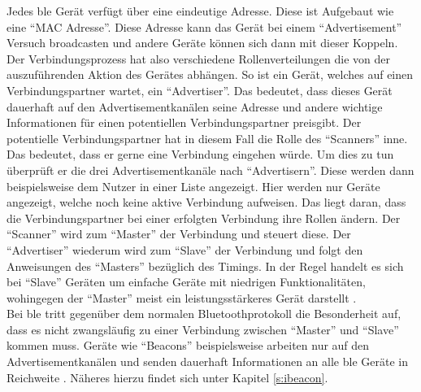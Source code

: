 \noindent Jedes \ac{ble} Gerät verfügt über eine eindeutige Adresse. Diese ist Aufgebaut wie eine "`MAC Adresse"'. Diese Adresse kann das Gerät bei einem "`Advertisement"' Versuch broadcasten und andere Geräte können sich dann mit dieser Koppeln. Der Verbindungsprozess hat also verschiedene Rollenverteilungen die von der auszuführenden Aktion des Gerätes abhängen. So ist ein Gerät, welches auf einen Verbindungspartner wartet, ein "`Advertiser"'. Das bedeutet, dass dieses Gerät dauerhaft auf den Advertisementkanälen seine Adresse und andere wichtige Informationen für einen potentiellen Verbindungspartner preisgibt. Der potentielle Verbindungspartner hat in diesem Fall die Rolle des "`Scanners"' inne. Das bedeutet, dass er gerne eine Verbindung eingehen würde. Um dies zu tun überprüft er die drei Advertisementkanäle nach "`Advertisern"'. Diese werden dann beispielsweise dem Nutzer in einer Liste angezeigt. Hier werden nur Geräte angezeigt, welche noch keine aktive Verbindung aufweisen. Das liegt daran, dass die Verbindungspartner bei einer erfolgten Verbindung ihre Rollen ändern. Der "`Scanner"' wird zum "`Master"' der Verbindung und steuert diese. Der "`Advertiser"' wiederum wird zum "`Slave"' der Verbindung und folgt den Anweisungen des "`Masters"' bezüglich des Timings. In der Regel handelt es sich bei "`Slave"' Geräten um einfache Geräte mit niedrigen Funktionalitäten, wohingegen der "`Master"' meist ein leistungsstärkeres Gerät darstellt \cite[Seite 18f]{Townsend14:GSB}.\\  

\noindent Bei \ac{ble} tritt gegenüber dem normalen Bluetoothprotokoll die Besonderheit auf, dass es nicht zwangsläufig zu einer Verbindung zwischen "`Master"' und "`Slave"' kommen muss. Geräte wie "`Beacons"' beispielsweise arbeiten nur auf den Advertisementkanälen und senden dauerhaft Informationen an alle \ac{ble} Geräte in Reichweite \cite[Seite 13]{Gast14:BPA}. Näheres hierzu findet sich unter Kapitel \ref{s:ibeacon}.\\


